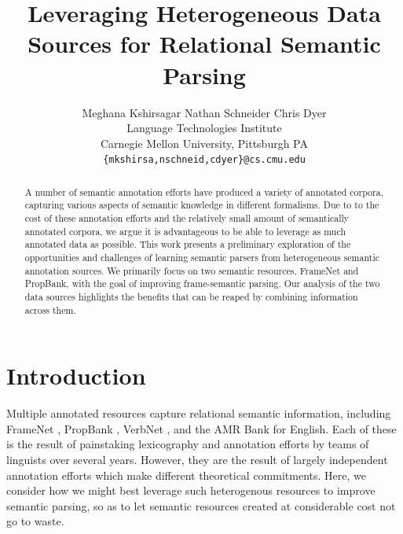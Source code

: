 \documentclass[11pt]{article}
\title{Leveraging Heterogeneous Data Sources for Relational Semantic Parsing}
\author{Meghana Kshirsagar
   \qquad
  Nathan Schneider
   \qquad
  Chris Dyer \\
  Language Technologies Institute \\
  Carnegie Mellon University, Pittsburgh PA\\
  {\tt \{mkshirsa,nschneid,cdyer\}@cs.cmu.edu} \\}
\date{}
\begin{document}
\maketitle
\begin{abstract}
A number of semantic annotation efforts have produced a variety of annotated corpora, capturing various aspects of semantic knowledge in different formalisms. Due to to the cost of these annotation efforts and the relatively small amount of semantically annotated corpora, we argue it is advantageous to be able to leverage as much annotated data as possible. This work presents a preliminary exploration of the opportunities and challenges of learning semantic parsers from heterogeneous semantic annotation sources. 
We primarily focus on two semantic resources, FrameNet and PropBank, with the goal of improving frame-semantic parsing. 
Our analysis of the two data sources highlights the benefits that can be reaped by combining information across them.
\end{abstract}

\section{Introduction}
Multiple annotated resources capture relational semantic information, including FrameNet \citep{framenet}, PropBank \citep{propbank}, 
VerbNet \citep{vnet}, and the AMR Bank \citep{amr} for English. 
Each of these is the result of painstaking lexicography and annotation efforts by teams of linguists over several years. 
However, they are the result of largely independent annotation efforts which make different theoretical commitments. 
Here, we consider how we might best leverage such heterogenous resources to improve semantic parsing, 
so as to let semantic resources created at considerable cost not go to waste.
\end{document}

